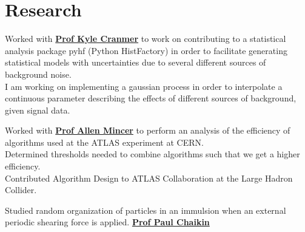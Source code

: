 

\section{Research}
Worked with \textbf{\href{https://as.nyu.edu/content/nyu-as/as/faculty/allen-mincer.html}{Prof Kyle Cranmer}} 
to work on contributing to a statistical analysis package pyhf (Python HistFactory) in order to facilitate generating statistical models with uncertainties due to several different sources of background noise. \\
I am working on implementing a gaussian process in order to interpolate a continuous parameter describing the effects of different sources of background, given signal data.
\sectionsep

Worked with \textbf{\href{https://as.nyu.edu/content/nyu-as/as/faculty/allen-mincer.html}{Prof Allen Mincer}} 
to perform an analysis of the efficiency of algorithms used at the ATLAS
experiment at CERN. \\
Determined thresholds needed to combine algorithms such that we get a higher
efficiency. \\
Contributed Algorithm Design to ATLAS Collaboration at the Large Hadron
Collider.
\sectionsep

Studied random organization of particles in an immulsion when an external periodic shearing force is applied.
\textbf{\href{http://www.physics.nyu.edu/~pc86/people/chaikin.html}{Prof Paul Chaikin}} 
\sectionsep
